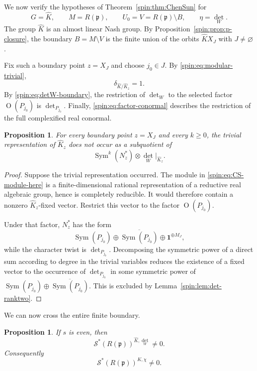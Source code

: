 \documentclass[10pt,a4paper]{amsart}
\numberwithin{equation}{section}
\newtheorem{proposition}[theorem]{Proposition}
\newcommand{\Or}{\operatorname{O}}
\newcommand{\Sym}{\operatorname{Sym}}
\newcommand{\fp}{\mathfrak p}
\newcommand{\cS}{\mathcal S}
\begin{document}
We now verify the hypotheses of Theorem~\ref{spin:thm:ChenSun} for
\begin{equation}\label{spin:eq:CS-data}
  G=\widehat K,
  \qquad
  M=R(\fp),
  \qquad
  U_0=V=R(\fp)\setminus B,
  \qquad
  \eta=\det_W.
\end{equation}
The group $\widehat K$ is an almost linear Nash group.  By
Proposition~\ref{spin:prop:p-closure}, the boundary $B=M\setminus V$ is the finite
union of the orbits $\widehat KX_J$ with $J\ne\varnothing$.

Fix such a boundary point $z=X_J$ and choose $j_0\in J$.  By
\eqref{spin:eq:modular-trivial},
\[
  \delta_{\widehat K/\widehat K_z}=1.
\]
By \eqref{spin:eq:detW-boundary}, the restriction of $\det_W$ to the selected
factor $\Or(P_{j_0})$ is $\det_{P_{j_0}}$.  Finally,
\eqref{spin:eq:factor-conormal} describes the restriction of the full complexified
real conormal.

\begin{proposition}\label{spin:prop:CS-vanishing}
For every boundary point $z=X_J$ and every $k\ge0$, the trivial
representation of $\widehat K_z$ does not occur as a subquotient of
\begin{equation}\label{spin:eq:CS-module-here}
  \Sym^k(N_z^*)\otimes\det_W|_{\widehat K_z}.
\end{equation}
\end{proposition}

\begin{proof}
Suppose the trivial representation occurred.  The module in
\eqref{spin:eq:CS-module-here} is a finite-dimensional rational representation of a
reductive real algebraic group, hence is completely reducible.  It would
therefore contain a nonzero $\widehat K_z$-fixed vector.  Restrict this vector
to the factor $\Or(P_{j_0})$.

Under that factor, $N_z^*$ has the form
\[
  \Sym(P_{j_0})\oplus\overline{\Sym(P_{j_0})}
  \oplus\mathbf1^{\oplus M_J},
\]
while the character twist is $\det_{P_{j_0}}$.  Decomposing the symmetric
power of a direct sum according to degree in the trivial variables reduces the
existence of a fixed vector to the occurrence of $\det_{P_{j_0}}$ in some
symmetric power of
$\Sym(P_{j_0})\oplus\overline{\Sym(P_{j_0})}$.  This is excluded by
Lemma~\ref{spin:lem:det-ranktwo}.
\end{proof}

We can now cross the entire finite boundary.

\begin{proposition}\label{spin:prop:even-regular-distribution}
If $s$ is even, then
\begin{equation}\label{spin:eq:regular-sign-nonzero}
  \cS^*(R(\fp))^{\widehat K,\det_W}\ne0.
\end{equation}
Consequently
\[
  \cS^*(R(\fp))^{K,\chi}\ne0.
\]
\end{proposition}
\end{document}
